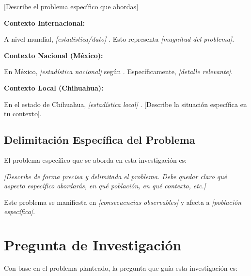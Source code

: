 [Describe el problema específico que abordas]

\textbf{Contexto Internacional:}

A nivel mundial, \textit{[estadística/dato]} \cite{fuente_internacional}. Esto representa \textit{[magnitud del problema]}.

\textbf{Contexto Nacional (México):}

En México, \textit{[estadística nacional]} según \cite{fuente_nacional_ej_INEGI}. Específicamente, \textit{[detalle relevante]}.

\textbf{Contexto Local (Chihuahua):}

En el estado de Chihuahua, \textit{[estadística local]} \cite{fuente_local}. [Describe la situación específica en tu contexto].

\subsection{Delimitación Específica del Problema}
\label{subsec:delimitacion_problema}

El problema específico que se aborda en esta investigación es:

\textit{[Describe de forma precisa y delimitada el problema. Debe quedar claro qué aspecto específico abordarás, en qué población, en qué contexto, etc.]}

Este problema se manifiesta en \textit{[consecuencias observables]} y afecta a \textit{[población específica]}.

\section{Pregunta de Investigación}
\label{sec:pregunta_investigacion}


Con base en el problema planteado, la pregunta que guía esta investigación es:

\begin{center}
\end{center}


